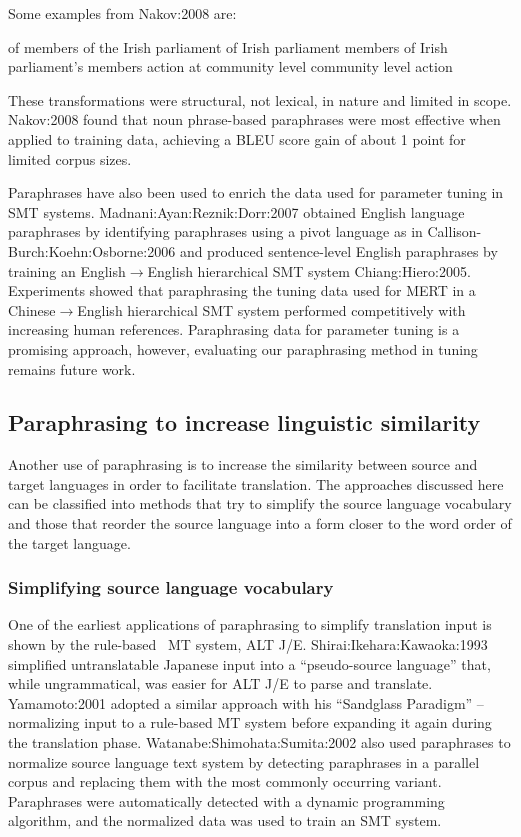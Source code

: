 \documentclass[english]{jnlp_1.4}
\newcommand{\citep}{}
\newcommand{\citet}{}
\newcommand{\JE}{}
\begin{document}
Some examples from \citet{Nakov:2008} are:
\begin{exe}
  \ex of members of the Irish parliament
  \trans of Irish parliament members
  \trans of Irish parliament's members
\ex action at community level
\trans community level action
\end{exe}

These transformations were structural, not lexical, in nature and
limited in scope. \citet{Nakov:2008} found that noun phrase-based
paraphrases were most effective when applied to training data,
achieving a BLEU score gain of about 1 point for limited corpus sizes.


Paraphrases have also been used to enrich the data used for parameter
tuning in SMT systems.
\citet{Madnani:Ayan:Reznik:Dorr:2007} obtained English language
paraphrases by identifying paraphrases using a pivot language as in
\citet{Callison-Burch:Koehn:Osborne:2006} and produced sentence-level
English paraphrases by training an English$\rightarrow$English
hierarchical SMT system \citep{Chiang:Hiero:2005}. Experiments showed
that paraphrasing the tuning data used for MERT in a
Chinese$\rightarrow$English hierarchical SMT system performed
competitively with increasing human references. Paraphrasing data for
parameter tuning is a promising approach, however, evaluating our
paraphrasing method in tuning remains future work.



\subsection{Paraphrasing to increase linguistic similarity}

Another use of paraphrasing is to increase the similarity between
source and target languages in order to facilitate translation. The
approaches discussed here can be classified into methods that try to
simplify the source language vocabulary and those that reorder the
source language into a form closer to the word order of the target
language.



\subsubsection{Simplifying source language vocabulary}


\indent One of the earliest applications of paraphrasing to simplify
translation input is shown by the rule-based \JE~MT system, ALT
J/E. \citet{Shirai:Ikehara:Kawaoka:1993} simplified untranslatable
Japanese input into a ``pseudo-source language'' that, while
ungrammatical, was easier for ALT J/E to parse and translate.
\citet{Yamamoto:2001} adopted a similar approach with his ``Sandglass
Paradigm'' \--- normalizing input to a rule-based MT system before
expanding it again during the translation phase.
\citet{Watanabe:Shimohata:Sumita:2002} also used paraphrases to
normalize source language text system by detecting paraphrases in a
parallel corpus and replacing them with the most commonly occurring
variant. Paraphrases were automatically detected with a dynamic
programming algorithm, and the normalized data was used to train an
SMT system.
\end{document}
